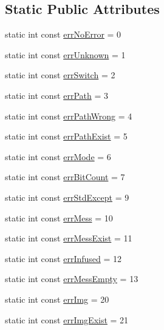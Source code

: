 \subsection*{Static Public Attributes}
\begin{DoxyCompactItemize}
\item 
static int const \mbox{\hyperlink{classErrorHandler_aeb08094d2754a72bdaf44a80c77d4189}{err\+No\+Error}} = 0
\item 
static int const \mbox{\hyperlink{classErrorHandler_a51e373250da346a49522dfdb99ddc1b3}{err\+Unknown}} = 1
\item 
static int const \mbox{\hyperlink{classErrorHandler_a348455e58aa6cbd002d7652da8b8c1bd}{err\+Switch}} = 2
\item 
static int const \mbox{\hyperlink{classErrorHandler_a5a289392b663eab72a8eba3ca0a88329}{err\+Path}} = 3
\item 
static int const \mbox{\hyperlink{classErrorHandler_aa25a9f5aef3ad844325d5fb3e0fa444d}{err\+Path\+Wrong}} = 4
\item 
static int const \mbox{\hyperlink{classErrorHandler_aced178ea322067ec756e3d1714efc6e4}{err\+Path\+Exist}} = 5
\item 
static int const \mbox{\hyperlink{classErrorHandler_a1ec0cf275df16d2fe2641cc29c0f2ff0}{err\+Mode}} = 6
\item 
static int const \mbox{\hyperlink{classErrorHandler_ae4e30eb033a9a5e2a04008a8be48ad67}{err\+Bit\+Count}} = 7
\item 
static int const \mbox{\hyperlink{classErrorHandler_a6615c791920f871f02b017d415acf991}{err\+Std\+Except}} = 9
\item 
static int const \mbox{\hyperlink{classErrorHandler_ad90d36769306a3eb3539eeb3ea2f77b5}{err\+Mess}} = 10
\item 
static int const \mbox{\hyperlink{classErrorHandler_a94d4ea423c97ff7a4784ff0043731783}{err\+Mess\+Exist}} = 11
\item 
static int const \mbox{\hyperlink{classErrorHandler_a6b02e9a761607b206e3b6f724d03ac29}{err\+Infused}} = 12
\item 
static int const \mbox{\hyperlink{classErrorHandler_add483ce97592710530c6f746c99c598d}{err\+Mess\+Empty}} = 13
\item 
static int const \mbox{\hyperlink{classErrorHandler_ad0d235ee5e68a371b7369ab80513d4ec}{err\+Img}} = 20
\item 
static int const \mbox{\hyperlink{classErrorHandler_a53571f96a023b3af97618425aaf169a6}{err\+Img\+Exist}} = 21
\item 

\end{DoxyCompactItemize}
